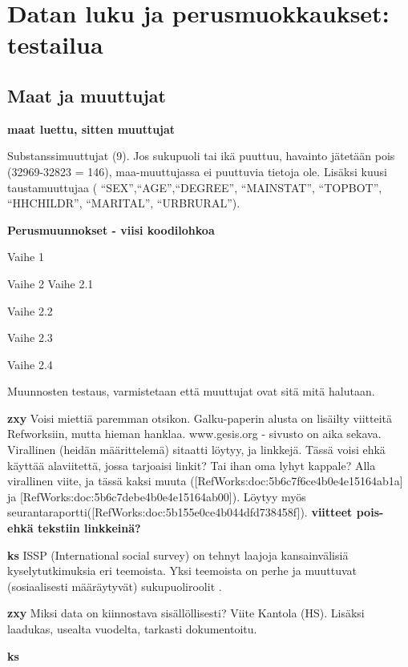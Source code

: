 \documentclass[
  finnish,
]{book}
\begin{document}
\hypertarget{datan-luku-ja-perusmuokkaukset-testailua}{%
\section{Datan luku ja perusmuokkaukset: testailua}\label{datan-luku-ja-perusmuokkaukset-testailua}}

\hypertarget{maat-ja-muuttujat}{%
\subsection{Maat ja muuttujat}\label{maat-ja-muuttujat}}

\textbf{maat luettu, sitten muuttujat}

Substanssimuuttujat (9). Jos sukupuoli tai ikä puuttuu, havainto jätetään pois
(32969-32823 = 146), maa-muuttujassa ei puuttuvia tietoja ole. Lisäksi kuusi
taustamuuttujaa ( ``SEX'',``AGE'',``DEGREE'', ``MAINSTAT'', ``TOPBOT'', ``HHCHILDR'',
``MARITAL'', ``URBRURAL'').

\textbf{Perusmuunnokset - viisi koodilohkoa}

Vaihe 1

Vaihe 2
Vaihe 2.1

Vaihe 2.2

Vaihe 2.3

Vaihe 2.4

Muunnosten testaus, varmistetaan että muuttujat ovat sitä mitä halutaan.

\textbf{zxy} Voisi miettiä paremman otsikon. Galku-paperin alusta on lisäilty
viitteitä Refworksiin, mutta hieman hanklaa. www.gesis.org - sivusto on aika
sekava. Virallinen (heidän määrittelemä) sitaatti löytyy, ja linkkejä. Tässä
voisi ehkä käyttää alaviitettä, jossa tarjoaisi linkit? Tai ihan oma lyhyt kappale?
Alla virallinen viite, ja tässä kaksi muuta ({[}RefWorks:doc:5b6c7f6ce4b0e4e15164ab1a{]}
ja {[}RefWorks:doc:5b6c7debe4b0e4e15164ab00{]}). Löytyy myös
seurantaraportti({[}RefWorks:doc:5b155e0ce4b044dfd738458f{]}).
\textbf{viitteet pois- ehkä tekstiin linkkeinä?}

\textbf{ks} ISSP (International social survey) on tehnyt laajoja kansainvälisiä kyselytutkimuksia eri teemoista. Yksi teemoista on perhe ja muuttuvat (sosiaalisesti määräytyvät) sukupuoliroolit \citep{RefWorks:doc:5b6c7b0de4b0fd36f5bb4c2a}.

\textbf{zxy} Miksi data on kiinnostava sisällöllisesti? Viite Kantola (HS). Lisäksi laadukas, usealta vuodelta, tarkasti dokumentoitu.

\textbf{ks}
\end{document}
